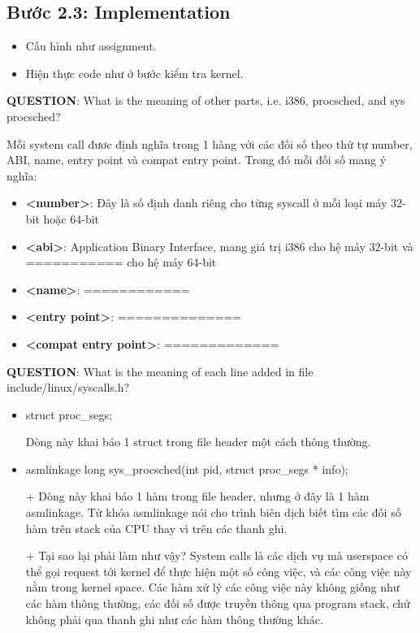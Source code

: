 \subsection{Bước 2.3: Implementation}

\begin{itemize}
	\item Cấu hình như assignment.
	\item Hiện thực code như ở bước kiểm tra kernel.
\end{itemize}


\textbf{QUESTION}: What is the meaning of other parts, i.e. i386, procsched, and sys procsched?

\vspace{0.2cm}

Mỗi system call đươc định nghĩa trong 1 hàng với các đối số theo thứ tự number, ABI, name, entry point và compat entry point.
Trong đó mỗi đối số mang ý nghĩa:

\begin{itemize}
	\item \textbf{<number>}: Đây là số định danh riêng cho từng syscall ở mỗi loại máy 32-bit hoặc 64-bit
	\item \textbf{<abi>}: Application Binary Interface, mang giá trị i386 cho hệ máy  32-bit và =========== cho hệ máy 64-bit
	\item \textbf{<name>}: ============
	\item \textbf{<entry point>}: ==============
	\item \textbf{<compat entry point>}: =============
\end{itemize}

\vspace{0.3cm}


\textbf{QUESTION}:  What is the meaning of each line added in file include/linux/syscalls.h?

\begin{itemize}
	\item struct proc\_segs;
	
Dòng này khai báo 1 struct trong file header một cách thông thường.
	
	\item asmlinkage long sys\_procsched(int pid, struct proc\_segs * info);

	+ Dòng này khai báo 1 hàm trong file header, nhưng ở đây là 1 hàm asmlinkage. Từ khóa asmlinkage nói cho trình biên dịch biết tìm các đối số hàm trên stack của CPU thay vì trên các thanh ghi.
	
	+ Tại sao lại phải làm như vậy? System calls là các dịch vụ mà userspace có thể gọi request tới kernel để thực hiện một số công việc, và các công việc này nằm trong kernel space. Các hàm xử lý các công việc này không giống như các hàm thông thường, các đối số được truyền thông qua program stack, chứ không phải qua thanh ghi như các hàm thông thường khác.
\end{itemize}
 

